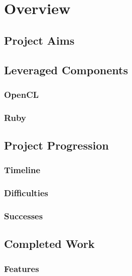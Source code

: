 \chapter{Overview}

\section{Project Aims}


\section{Leveraged Components}
\subsection{OpenCL}


\subsection{Ruby}


\section{Project Progression}
\subsection{Timeline}

\subsection{Difficulties}

\subsection{Successes}

\section{Completed Work}
\subsection{Features}

